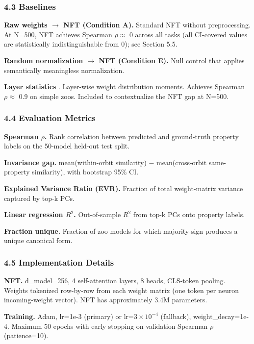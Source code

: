 \subsubsection{4.3 Baselines}

\textbf{Raw weights $\rightarrow$ NFT (Condition A).} Standard NFT without preprocessing. At N=500, NFT achieves Spearman $\rho \approx$ 0 across all tasks (all CI-covered values are statistically indistinguishable from 0); see Section 5.5.

\textbf{Random normalization $\rightarrow$ NFT (Condition E).} Null control that applies semantically meaningless normalization.

\textbf{Layer statistics} \citep{Unterthiner2020PredictingNN}. Layer-wise weight distribution moments. Achieves Spearman $\rho \approx$ 0.9 on simple zoos. Included to contextualize the NFT gap at N=500.

\subsubsection{4.4 Evaluation Metrics}

\textbf{Spearman $\rho$.} Rank correlation between predicted and ground-truth property labels on the 50-model held-out test split.

\textbf{Invariance gap.} mean(within-orbit similarity) $-$ mean(cross-orbit same-property similarity), with bootstrap 95\% CI.

\textbf{Explained Variance Ratio (EVR).} Fraction of total weight-matrix variance captured by top-k PCs.

\textbf{Linear regression $R^2$.} Out-of-sample $R^2$ from top-k PCs onto property labels.

\textbf{Fraction unique.} Fraction of zoo models for which majority-sign produces a unique canonical form.

\subsubsection{4.5 Implementation Details}

\textbf{NFT.} d\_model=256, 4 self-attention layers, 8 heads, CLS-token pooling. Weights tokenized row-by-row from each weight matrix (one token per neuron incoming-weight vector). NFT has approximately 3.4M parameters.

\textbf{Training.} Adam, lr=1e-3 (primary) or lr=$3\times 10^{-4}$ (fallback), weight\_decay=1e-4. Maximum 50 epochs with early stopping on validation Spearman $\rho$ (patience=10).

